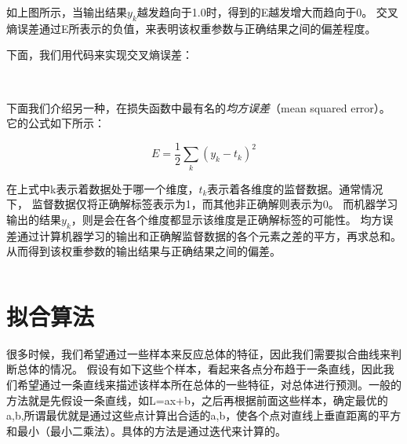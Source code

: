 
如上图所示，当输出结果$y_{k}$越发趋向于1.0时，得到的E越发增大而趋向于0。
交叉熵误差通过E所表示的负值，来表明该权重参数与正确结果之间的偏差程度。

下面，我们用代码来实现交叉熵误差：
\begin{lstlisting}[language=Java,caption={交叉熵误差}]
\end{lstlisting}



\ \\
下面我们介绍另一种，在损失函数中最有名的\emph{均方误差}（mean squared error）。
它的公式如下所示：

\begin{equation}
    E = \frac { 1 } { 2 } \sum _ { k } \left( y _ { k } - t _ { k } \right) ^ { 2 }
    \label{part2_cross_entropy_error_2}
\end{equation}

在上式中k表示着数据处于哪一个维度，$t_{k}$表示着各维度的监督数据。通常情况下，
监督数据仅将正确解标签表示为1，而其他非正确解则表示为0。
而机器学习输出的结果$y_{k}$，则是会在各个维度都显示该维度是正确解标签的可能性。
均方误差通过计算机器学习的输出和正确解监督数据的各个元素之差的平方，再求总和。
从而得到该权重参数的输出结果与正确结果之间的偏差。

\begin{lstlisting}[language=Java,caption={均方误差}]
\end{lstlisting}



\section{拟合算法}

很多时候，我们希望通过一些样本来反应总体的特征，因此我们需要拟合曲线来判断总体的情况。 
假设有如下这些个样本，看起来各点分布趋于一条直线，因此我们希望通过一条直线来描述该样本所在总体的一些特征，对总体进行预测。一般的方法就是先假设一条直线，如L=ax+b，之后再根据前面这些样本，确定最优的a,b,所谓最优就是通过这些点计算出合适的a,b，使各个点对直线上垂直距离的平方和最小（最小二乘法）。具体的方法是通过迭代来计算的。












